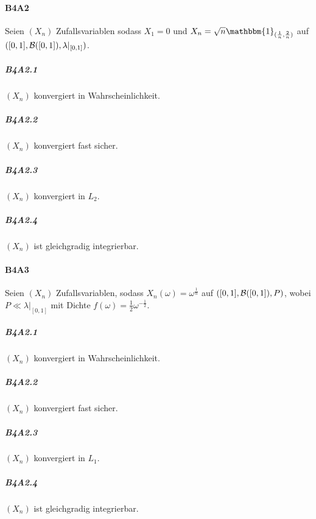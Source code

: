 \documentclass{article}
\begin{document}
\paragraph{B4A2}
Seien $(X_n)$ Zufallsvariablen sodass $X_1=0$ und $X_n=\sqrt{n}\mathbbm{1}_{(\frac{1}{n},\frac{2}{n})}$ auf $([0,1],{\cal B}([0,1]),\lambda|_{[0,1]})$.
\subparagraph{B4A2.1} $(X_n)$ konvergiert in Wahrscheinlichkeit.

\subparagraph{B4A2.2} $(X_n)$ konvergiert fast sicher.

\subparagraph{B4A2.3} $(X_n)$ konvergiert in $L_2$.

\subparagraph{B4A2.4} $(X_n)$ ist gleichgradig integrierbar.
\newpage

\paragraph{B4A3} Seien $(X_n)$ Zufallsvariablen, sodass $X_n(\omega)=\omega^{\frac{1}{n}}$ auf $([0,1],{\cal B}([0,1]),P)$, wobei $P\ll\lambda|_{[0,1]}$ mit Dichte $f(\omega)=\frac{1}{2}\omega^{-\frac{1}{2}}$.
\subparagraph{B4A2.1} $(X_n)$ konvergiert in Wahrscheinlichkeit.

\subparagraph{B4A2.2} $(X_n)$ konvergiert fast sicher.

\subparagraph{B4A2.3} $(X_n)$ konvergiert in $L_1$.

\subparagraph{B4A2.4} $(X_n)$ ist gleichgradig integrierbar.
\newpage


\end{document}
